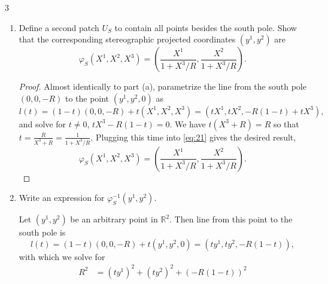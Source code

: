 \documentclass[11pt]{article}
\begin{document}
\begin{problem}{3}
\begin{enumerate}[label=(\alph*)]
\begin{answer}
			      Defining \( r^2 = (x^1)^2 + (x^2)^2 \), we can then write the inverse map as
			      \begin{equation}
				      \label{eq:20}
				      \varphi_N^{-1}(x^1, x^2) = \frac{R}{r^2 + R^2} \left( 2Rx^1, 2Rx^2,  r^2 - R^2 \right).
			      \end{equation}
		      \end{answer}
		\item Define a second patch \( U_S \) to contain all points besides the south pole.
		      Show that the corresponding stereographic projected coordinates \( (y^1, y^2) \) are
		      \begin{equation}
			      \label{eq:3}
			      \varphi_S(X^1, X^2, X^3) = \left( \frac{X^{1}}{1 + X^3/R}, \frac{X^2}{1 + X^3/R} \right).
		      \end{equation}
		      \begin{proof}
			      Almost identically to part (a), parametrize the line from the south pole \( (0,0, -R) \) to the point \( (y^1, y^2, 0) \) as
			      \begin{equation}
				      \label{eq:21}
				      l(t) = (1-t)(0,0,-R) + t(X^1, X^2, X^3) = (t X^1, tX^2, -R(1-t) + tX^3),
			      \end{equation}
			      and solve for \( t \neq 0 \), \( t X^3 -R(1-t) = 0 \).
			      We have \( t(X^3 + R) = R \) so that \( t = \frac{R}{X^3 + R} = \frac{1}{1 + X^3/R}\).
			      Plugging this time into \cref{eq:21} gives the desired result,
			      \begin{equation}
				      \label{eq:22}
				      \varphi_S(X^1, X^2, X^3) = \left( \frac{X^1}{1 + X^3/R}, \frac{X^2}{1 + X^3/R} \right).
			      \end{equation}
		      \end{proof}
		\item Write an expression for \(\varphi^{-1}_S(y^1, y^2)\).
          \begin{answer}
            Let \( (y^1, y^2) \) be an arbitrary point in \( \mathbb{R}^2 \).
            Then line from this point to the south pole is
            \begin{equation}
            \label{eq:p3d-line}
            l(t) = (1-t)(0,0,-R) + t(y^1, y^2, 0) = (ty^1, ty^2, -R(1-t)),
            \end{equation}
            with which we solve for
            \begin{equation}
              \label{eq:38}
              \begin{aligned}
                R^2 &= (t y^1)^2 + (ty^2)^2 + (-R(1-t))^2 \\

\end{aligned}
\end{equation}
\end{answer}
\end{enumerate}
\end{problem}
\end{document}
